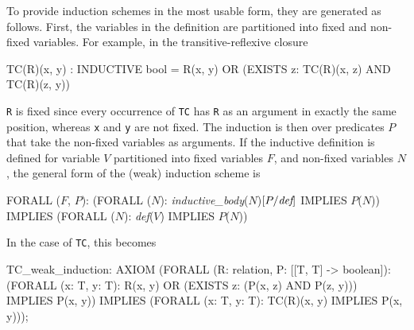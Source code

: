 To provide induction schemes in the most usable form, they are generated
as follows.  First, the variables in the definition are partitioned into
fixed and non-fixed variables.  For
example, in the transitive-reflexive closure
\begin{pvsex}
  TC(R)(x, y) : INDUCTIVE bool =
     R(x, y) OR (EXISTS z: TC(R)(x, z) AND TC(R)(z, y))
\end{pvsex}
\texttt{R} is fixed since every occurrence of \texttt{TC} has \texttt{R}
as an argument in exactly the same position, whereas \texttt{x} and
\texttt{y} are not fixed.  The induction is then over predicates $P$ that
take the non-fixed variables as arguments.  If the inductive definition is
defined for variable $V$ partitioned into fixed variables $F$, and
non-fixed variables $N$, the general form of the (weak) induction scheme
is
\begin{pvsex}
  FORALL (\(F\), \(P\)):
   (FORALL (\(N\)):
     \emph{inductive_body}(\(N\))\([P/\emph{def}]\) IMPLIES \(P\)(\(N\)))
      IMPLIES
     (FORALL (\(N\)): \emph{def}(\(V\)) IMPLIES \(P\)(\(N\)))
\end{pvsex}
In the case of \texttt{TC}, this becomes
\begin{pvsex}
  TC_weak_induction: AXIOM
        (FORALL (R: relation, P: [[T, T] -> boolean]):
           (FORALL (x: T, y: T):
              R(x, y) OR (EXISTS z: (P(x, z) AND P(z, y))) IMPLIES P(x, y))
               IMPLIES (FORALL (x: T, y: T): TC(R)(x, y) IMPLIES P(x, y)));
\end{pvsex}
